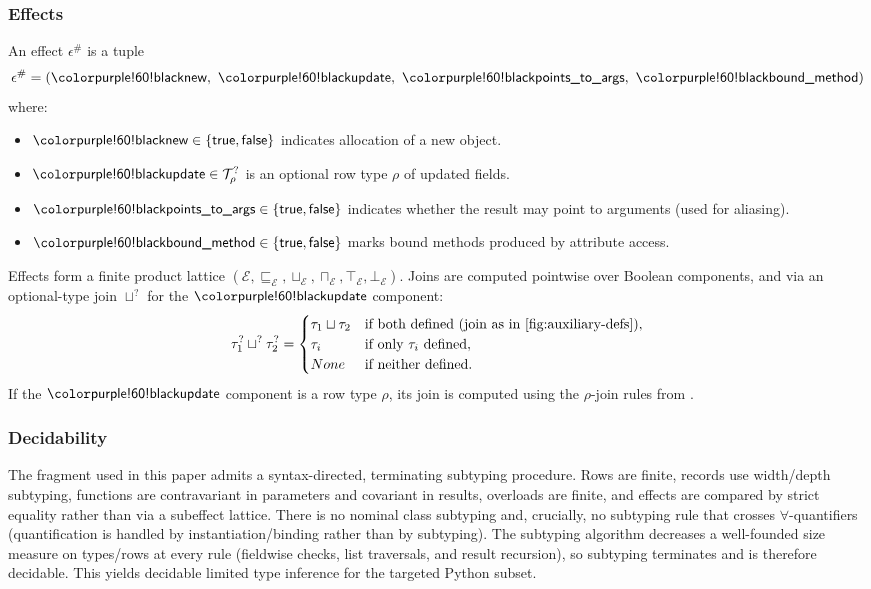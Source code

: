 \subsubsection*{Effects}
\label{sec:effects}
An effect $\epsilon^\#$ is a tuple
\[
\epsilon^\# = (\tnew,\ \tupdate,\ \tptstoargs,\ \tboundmeth)
\]
where:
\begin{itemize}
  \item $\tnew \in \{\mathsf{true},\mathsf{false}\}$ indicates allocation of a new object.
  \item $\tupdate \in \mathcal{T}^?_{\rho}$ is an optional row type $\rho$ of updated fields.
  \item $\tptstoargs \in \{\mathsf{true},\mathsf{false}\}$ indicates whether the result may point to arguments (used for aliasing).
  \item $\tboundmeth \in \{\mathsf{true},\mathsf{false}\}$ marks bound methods produced by attribute access.
\end{itemize}

Effects form a finite product lattice $(\mathcal{E}, \sqsubseteq_{\mathcal{E}}, \sqcup_{\mathcal{E}}, \sqcap_{\mathcal{E}}, \top_{\mathcal{E}}, \bot_{\mathcal{E}})$.  
Joins are computed pointwise over Boolean components, and via an optional-type join $\sqcup^?$ for the $\tupdate$ component:
\[
\tau_1^? \sqcup^? \tau_2^? =
\begin{cases}
\tau_1 \sqcup \tau_2 & \text{if both defined (join as in \Cref{fig:auxiliary-defs})},\\
\tau_i & \text{if only $\tau_i$ defined},\\
None & \text{if neither defined}.
\end{cases}
\]
If the $\tupdate$ component is a row type $\rho$, its join is computed using the $\rho$-join rules from .

\subsubsection*{Decidability}
The fragment used in this paper admits a syntax-directed, terminating subtyping procedure. Rows are finite, records use width/depth subtyping, functions are contravariant in parameters and covariant in results, overloads are finite, and effects are compared by strict equality rather than via a subeffect lattice. There is no nominal class subtyping and, crucially, no subtyping rule that crosses $\forall$-quantifiers (quantification is handled by instantiation/binding rather than by subtyping). The subtyping algorithm decreases a well-founded size measure on types/rows at every rule (fieldwise checks, list traversals, and result recursion), so subtyping terminates and is therefore decidable. This yields decidable limited type inference for the targeted Python subset. 

